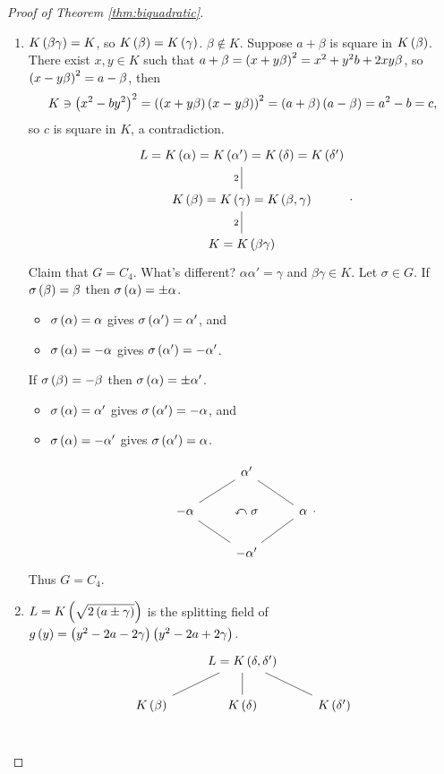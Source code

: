 \begin{proof}[Proof of Theorem \ref{thm:biquadratic}]
\begin{enumerate}
\item $ K\rb{\beta\gamma} = K $, so $ K\rb{\beta} = K\rb{\gamma} $. $ \beta \notin K $. Suppose $ a + \beta $ is square in $ K\rb{\beta} $. There exist $ x, y \in K $ such that $ a + \beta = \rb{x + y\beta}^2 = x^2 + y^2b + 2xy\beta $, so $ \rb{x - y\beta}^2 = a - \beta $, then
$$ K \ni \rb{x^2 - by^2}^2 = \rb{\rb{x + y\beta}\rb{x - y\beta}}^2 = \rb{a + \beta}\rb{a - \beta} = a^2 - b = c, $$
so $ c $ is square in $ K $, a contradiction.
$$
\begin{tikzcd}
L = K\rb{\alpha} = K\rb{\alpha'} = K\rb{\delta} = K\rb{\delta'} \\
K\rb{\beta} = K\rb{\gamma} = K\rb{\beta, \gamma} \arrow[dash]{u}{2} \\
K = K\rb{\beta\gamma} \arrow[dash]{u}{2}
\end{tikzcd}.
$$
Claim that $ G = C_4 $. What's different? $ \alpha\alpha' = \gamma $ and $ \beta\gamma \in K $. Let $ \sigma \in G $. If $ \sigma\rb{\beta} = \beta $ then $ \sigma\rb{\alpha} = \pm\alpha $.
\begin{itemize}
\item $ \sigma\rb{\alpha} = \alpha $ gives $ \sigma\rb{\alpha'} = \alpha' $, and
\item $ \sigma\rb{\alpha} = -\alpha $ gives $ \sigma\rb{\alpha'} = -\alpha' $.
\end{itemize}
If $ \sigma\rb{\beta} = -\beta $ then $ \sigma\rb{\alpha} = \pm\alpha' $.
\begin{itemize}
\item $ \sigma\rb{\alpha} = \alpha' $ gives $ \sigma\rb{\alpha'} = -\alpha $, and
\item $ \sigma\rb{\alpha} = -\alpha' $ gives $ \sigma\rb{\alpha'} = \alpha $.
\end{itemize}
$$
\begin{tikzcd}
& \alpha' & \\
-\alpha \arrow[dash]{ur} & \curvearrowleft \sigma & \alpha \arrow[dash]{ul} \\
& -\alpha' \arrow[dash]{ul} \arrow[dash]{ur} &
\end{tikzcd}.
$$
Thus $ G = C_4 $.
\item $ L = K\rb{\sqrt{2\rb{a \pm \gamma}}} $ is the splitting field of $ g\rb{y} = \rb{y^2 - 2a - 2\gamma}\rb{y^2 - 2a + 2\gamma} $.
$$
\begin{tikzcd}
& L = K\rb{\delta, \delta'} & \\
K\rb{\beta} \arrow[dash]{ur} & K\rb{\delta} \arrow[dash]{u} & K\rb{\delta'} \arrow[dash, swap]{ul} \\

\end{tikzcd}$$
\end{enumerate}
\end{proof}
